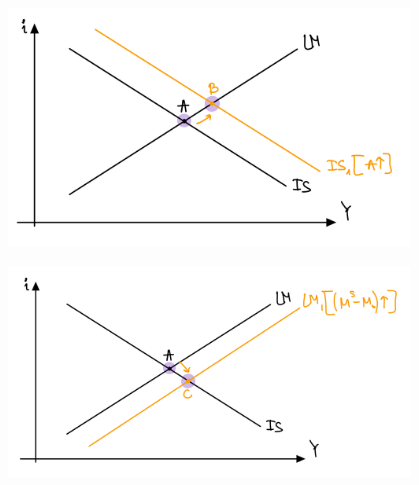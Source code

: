 \documentclass[a4paper,11pt]{article}
\begin{document}
\begin{RTL}
\begin{figure}[H]
    \begin{small}
        \begin{center}
            \includegraphics[width=0.95\textwidth]{figures/ISLM IS move.png}
        \end{center}
        \label{fig:}
    \end{small}
\end{figure}

\begin{figure}[H]
    \begin{small}
        \begin{center}
            \includegraphics[width=0.95\textwidth]{figures/ISLM LM Move.png}
        \end{center}
        \label{fig:}
    \end{small}
\end{figure}




\end{RTL}
\end{document}
